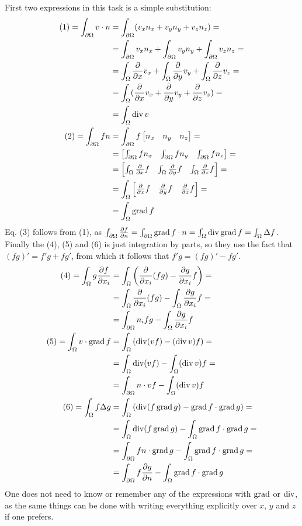 \documentclass[12pt,class=article,crop=false,preview=false]{standalone}
\begin{document}
\begin{solution}
First two expressions in this task is a simple substitution:
\begin{align*}
    (1) = \int_{\partial\Omega} v\cdot n
    &= \int_{\partial\Omega} (v_xn_x+v_yn_y+v_zn_z) = \\
    &= \int_{\partial\Omega} v_xn_x + \int_{\partial\Omega}v_yn_y + \int_{\partial\Omega}v_zn_z = \\
    &= \int_{\Omega} \frac{\partial}{\partial x}v_x + \int_{\Omega} \frac{\partial}{\partial y}v_y + \int_{\Omega} \frac{\partial}{\partial z}v_z = \\
    &= \int_{\Omega} (\frac{\partial}{\partial x}v_x + \frac{\partial}{\partial y}v_y + \frac{\partial}{\partial z}v_z) = \\
    &= \int_{\Omega} \operatorname{div} v\\
    (2) = \int_{\partial\Omega} f n
    &= \int_{\partial\Omega} f \left[\begin{matrix}n_x & n_y & n_z\end{matrix}\right] = \\
    &= \left[\begin{matrix}\int_{\partial\Omega} f n_x & \int_{\partial\Omega} f n_y & \int_{\partial\Omega} f n_z\end{matrix}\right] = \\
    &= \left[\begin{matrix}\int_{\Omega} \frac{\partial}{\partial x}f & \int_{\Omega} \frac{\partial}{\partial y}f & \int_{\Omega} \frac{\partial}{\partial z}f\end{matrix}\right] = \\
    &= \int_{\Omega} \left[\begin{matrix}\frac{\partial}{\partial x}f & \frac{\partial}{\partial y}f & \frac{\partial}{\partial z}f\end{matrix}\right] = \\
    &= \int_{\Omega} \operatorname{grad} f
\end{align*}
Eq. (3) follows from (1), as $\int_{\partial\Omega} \frac{\partial f}{\partial n} = \int_{\partial\Omega} \operatorname{grad}{f}\cdot n = \int_{\Omega} \operatorname{div}\operatorname{grad}{f} = \int_{\Omega} \Delta f$. Finally the (4), (5) and (6) is just integration by parts, so they use the fact that $(fg)' = f'g + fg'$, from which it follows that $f'g = (fg)' - fg'$.
\begin{align*}
(4) = \int_\Omega g\frac{\partial f}{\partial x_i}
&= \int_\Omega \left(\frac{\partial}{\partial x_i}(fg) - \frac{\partial g}{\partial x_i}f\right) =\\
&= \int_\Omega \frac{\partial}{\partial x_i}(fg) - \int_\Omega \frac{\partial g}{\partial x_i}f =\\
&= \int_{\partial\Omega} n_i fg - \int_\Omega \frac{\partial g}{\partial x_i}f\\
(5) = \int_\Omega v\cdot\operatorname{grad}{f}
&= \int_\Omega \left(\operatorname{div}(vf) - (\operatorname{div} v)f\right) =\\
&= \int_\Omega\operatorname{div}(vf) - \int_\Omega(\operatorname{div} v)f =\\
&= \int_{\partial\Omega}n\cdot vf - \int_\Omega(\operatorname{div} v)f\\
(6) = \int_\Omega f\Delta{g}
&= \int_\Omega \left(\operatorname{div}(f\operatorname{grad}{g}) - \operatorname{grad}{f}\cdot\operatorname{grad}{g}\right) =\\
&= \int_\Omega\operatorname{div}(f\operatorname{grad}{g}) - \int_\Omega \operatorname{grad}{f}\cdot\operatorname{grad}{g} =\\
&= \int_{\partial\Omega}fn\cdot\operatorname{grad}{g} - \int_\Omega \operatorname{grad}{f}\cdot\operatorname{grad}{g} =\\
&= \int_{\partial\Omega}f\frac{\partial g}{\partial n} - \int_\Omega \operatorname{grad}{f}\cdot\operatorname{grad}{g}\\
\end{align*}
One does not need to know or remember any of the expressions with $\operatorname{grad}$ or $\operatorname{div}$, as the same things can be done with writing everything explicitly over $x$, $y$ and $z$ if one prefers.
\end{solution}
\end{document}
